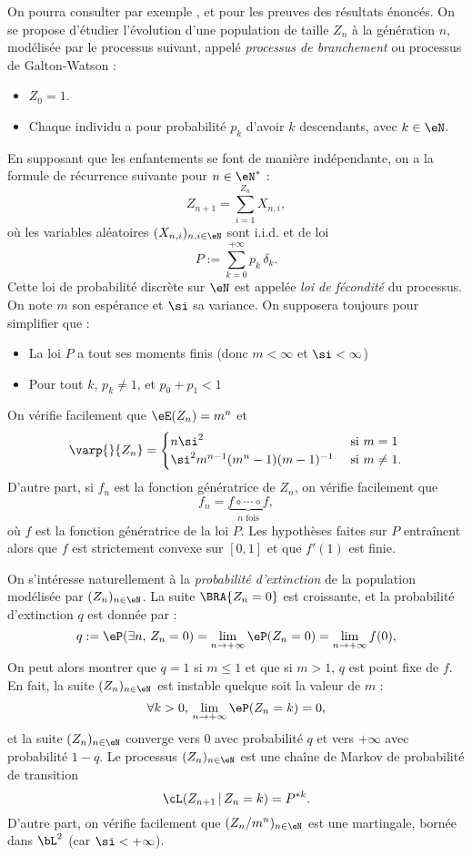 On pourra consulter par exemple \cite{harris-63}, \cite{harris-fr} et
\cite{williams} pour les preuves des résultats énoncés. On se propose
d'étudier l'évolution d'une population de taille $Z_n$ à la génération
$n$, modélisée par le processus suivant, appelé \emph{processus de
  branchement} ou processus de Galton-Watson :
\begin{itemize}
\item $Z_0=1$.
\item Chaque individu a pour probabilité $p_k$ d'avoir $k$ descendants, avec
  $k\in\eN$.
\end{itemize}
En supposant que les enfantements se font de manière indépendante, on
a la formule de récurrence suivante pour $n\in\eN^*$ :
$$
Z_{n+1}=\sum_{i=1}^{Z_n} X_{n,i},
$$
où les variables aléatoires $(X_{n,i})_{n,i\in\eN}$ sont i.i.d. et
de loi
$$
P:=\sum_{k=0}^{+\infty} p_k\,\delta_k. 
$$
Cette loi de probabilité discrète sur $\eN$ est appelée \emph{loi
  de fécondité} du processus. On note $m$ son espérance et $\si$ sa
variance.  On supposera toujours pour simplifier que :
\begin{itemize}
\item La loi $P$ a tout ses moments finis (donc $m<\infty$ et
  $\si<\infty$)
\item Pour tout $k$, $p_k\neq 1$, et $p_0+p_1<1$
\end{itemize}
On vérifie facilement que $\eE(Z_n)=m^n$ et 
$$
\varp{}{Z_n}=
\begin{cases}
  n\si^2 & \text{ si $m=1$}\\
  \si^2m^{n-1}(m^n-1)(m-1)^{-1} & \text{ si $m\neq 1$}.
\end{cases}
$$
D'autre part, si $f_n$ est la fonction génératrice de $Z_n$, on
vérifie facilement que
$$
f_n=\underbrace{f\circ \cdots \circ f}_{n \text{ fois}},
$$
où $f$ est la fonction génératrice de la loi $P$. Les hypothèses
faites sur $P$ entraînent alors que $f$ est strictement convexe sur
$[0,1]$ et que $f'(1)$ est finie.

On s'intéresse naturellement à la \emph{probabilité d'extinction} de
la population modélisée par $(Z_n)_{n\in\eN}$.  La suite $\BRA{Z_n=0}$
est croissante, et la probabilité d'extinction $q$ est donnée par :
$$
q:=\eP(\exists n,\,Z_n=0) =\lim_{n\to+\infty} \eP(Z_n=0)
=\lim_{n\to+\infty} f(0),
$$
On peut alors montrer que $q=1$ si $m\leq 1$ et que si $m>1$, $q$ est point
fixe de $f$. En fait, la suite $(Z_n)_{n\in\eN}$ est instable quelque soit la
valeur de $m$ :
$$
\forall k>0,\,\lim_{n\to+\infty}\eP(Z_n=k)=0, 
$$
et la suite $(Z_n)_{n\in\eN}$ converge vers $0$ avec probabilité $q$ et
vers $+\infty$ avec probabilité $1-q$. Le processus $(Z_n)_{n\in\eN}$ est une
chaîne de Markov de probabilité de transition
$$
\cL(Z_{n+1}\,\vert\,Z_n=k)=P^{*k}.
$$
D'autre part, on vérifie facilement que $(Z_n/m^n)_{n\in\eN}$ est une
martingale, bornée dans $\bL^2$ (car $\si<+\infty$).


